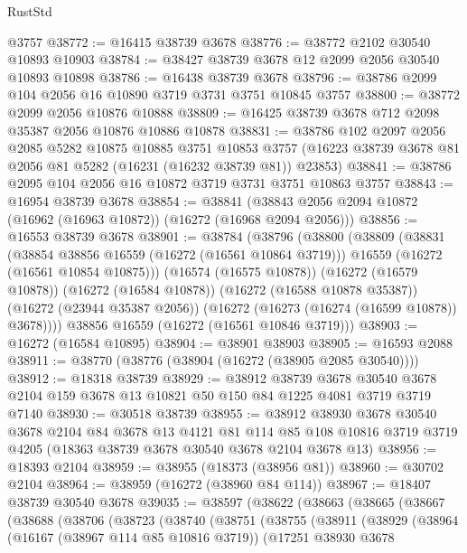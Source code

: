 \begin{lexlean}{RustStd}
\begin{coremodule}
    @3757
@38772 := @16415 @38739 @3678
@38776 := @38772 @2102 @30540 @10893 @10903
@38784 := @38427 @38739 @3678 @12 @2099 @2056 @30540 @10893 @10898
@38786 := @16438 @38739 @3678
@38796 := @38786 @2099 @104 @2056 @16 @10890 @3719 @3731 @3751 @10845 @3757
@38800 := @38772 @2099 @2056 @10876 @10888
@38809 := @16425 @38739 @3678 @712 @2098 @35387 @2056 @10876 @10886 @10878
@38831 := @38786
    @102
    @2097
    @2056
    @2085
    @5282
    @10875
    @10885
    @3751
    @10853
    @3757
    (@16223 @38739 @3678 @81 @2056 @81 @5282 (@16231 (@16232 @38739 @81)) @23853)
@38841 := @38786 @2095 @104 @2056 @16 @10872 @3719 @3731 @3751 @10863 @3757
@38843 := @16954 @38739 @3678
@38854 := @38841 (@38843 @2056 @2094 @10872 (@16962 (@16963 @10872)) (@16272 (@16968 @2094 @2056)))
@38856 := @16553 @38739 @3678
@38901 := @38784
    (@38796
      (@38800
        (@38809
          (@38831
            (@38854 @38856 @16559 (@16272 (@16561 @10864 @3719)))
            @16559
            (@16272 (@16561 @10854 @10875)))
          (@16574 (@16575 @10878))
          (@16272 (@16579 @10878))
          (@16272 (@16584 @10878))
          (@16272 (@16588 @10878 @35387))
          (@16272 (@23944 @35387 @2056))
          (@16272 (@16273 (@16274 (@16599 @10878)) @3678))))
      @38856
      @16559
      (@16272 (@16561 @10846 @3719)))
@38903 := @16272 (@16584 @10895)
@38904 := @38901 @38903
@38905 := @16593 @2088
@38911 := @38770 (@38776 (@38904 (@16272 (@38905 @2085 @30540))))
@38912 := @18318 @38739
@38929 := @38912
    @38739
    @3678
    @30540
    @3678
    @2104
    @159
    @3678
    @13
    @10821
    @50
    @150
    @84
    @1225
    @4081
    @3719
    @3719
    @7140
@38930 := @30518 @38739
@38955 := @38912
    @38930
    @3678
    @30540
    @3678
    @2104
    @84
    @3678
    @13
    @4121
    @81
    @114
    @85
    @108
    @10816
    @3719
    @3719
    @4205
    (@18363 @38739 @3678 @30540 @3678 @2104 @3678 @13)
@38956 := @18393 @2104
@38959 := @38955 (@18373 (@38956 @81))
@38960 := @30702 @2104
@38964 := @38959 (@16272 (@38960 @84 @114))
@38967 := @18407 @38739 @30540 @3678
@39035 := @38597
    (@38622
      (@38663
        (@38665
          (@38667
            (@38688
              (@38706
                (@38723
                  (@38740
                    (@38751
                      (@38755
                        (@38911
                          (@38929
                            (@38964
                              (@16167 (@38967 @114 @85 @10816 @3719))
                              (@17251
                                @38930
                                @3678

\end{coremodule}
\end{lexlean}
